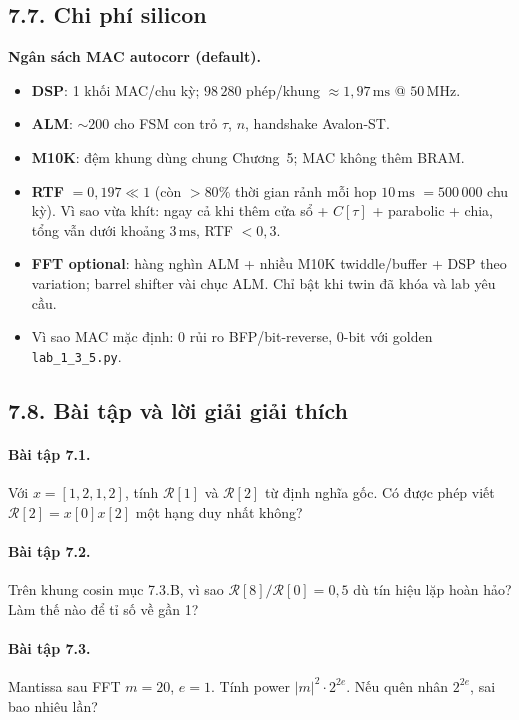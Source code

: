 \subsection*{7.7. Chi phí silicon}

\begin{costbox}
\textbf{Ngân sách MAC autocorr (default).}
\begin{itemize}[leftmargin=1.2em]
\item \textbf{DSP}: 1 khối MAC/chu kỳ; $98\,280$ phép/khung $\approx 1{,}97\,\text{ms}$ @ $50\,\text{MHz}$.
\item \textbf{ALM}: $\sim 200$ cho FSM con trỏ $\tau$, $n$, handshake Avalon-ST.
\item \textbf{M10K}: đệm khung dùng chung Chương~5; MAC không thêm BRAM.
\item \textbf{RTF} $= 0{,}197 \ll 1$ (còn $>80\%$ thời gian rảnh mỗi hop $10\,\text{ms}$ $= 500\,000$ chu kỳ). Vì sao vừa khít: ngay cả khi thêm cửa sổ + $C[\tau]$ + parabolic + chia, tổng vẫn dưới khoảng $3\,\text{ms}$, RTF $<0{,}3$.
\item \textbf{FFT optional}: hàng nghìn ALM + nhiều M10K twiddle/buffer + DSP theo variation; barrel shifter vài chục ALM. Chỉ bật khi twin đã khóa và lab yêu cầu.
\item Vì sao MAC mặc định: 0 rủi ro BFP/bit-reverse, 0-bit với golden \texttt{lab\_1\_3\_5.py}.
\end{itemize}
\end{costbox}

\subsection*{7.8. Bài tập và lời giải giải thích}

\paragraph{Bài tập 7.1.} Với $x = [1,2,1,2]$, tính $\mathcal{R}[1]$ và $\mathcal{R}[2]$ từ định nghĩa gốc. Có được phép viết $\mathcal{R}[2] = x[0]x[2]$ một hạng duy nhất không?

\paragraph{Bài tập 7.2.} Trên khung cosin mục 7.3.B, vì sao $\mathcal{R}[8]/\mathcal{R}[0] = 0{,}5$ dù tín hiệu lặp hoàn hảo? Làm thế nào để tỉ số về gần 1?

\paragraph{Bài tập 7.3.} Mantissa sau FFT $m = 20$, $e = 1$. Tính power $|m|^2\cdot 2^{2e}$. Nếu quên nhân $2^{2e}$, sai bao nhiêu lần?

